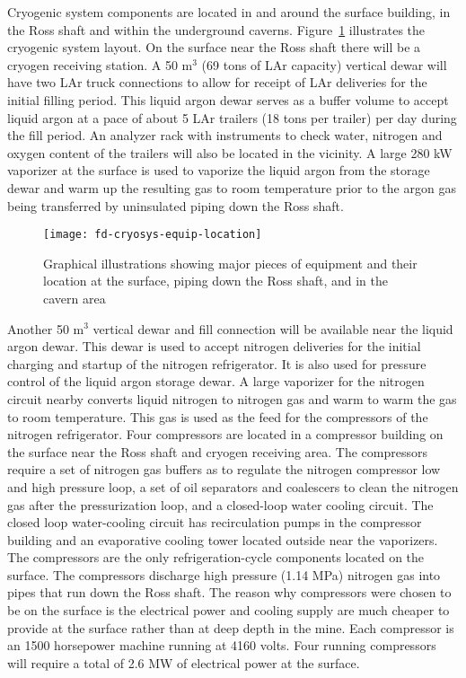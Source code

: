 Cryogenic system components are located in and around the surface 
building, in the Ross shaft and within the underground caverns. 
Figure~\ref{fig:eqp-at-surface} illustrates 
the cryogenic system layout. On the surface near the Ross 
shaft there will be a cryogen 
receiving station. A 50 m$^3$ (69 tons of LAr capacity) 
vertical dewar will have two LAr truck connections 
to allow for receipt of LAr deliveries for the initial
filling period. This liquid argon dewar serves as a buffer volume 
to accept liquid argon at a pace of about 5 LAr trailers 
(18 tons per trailer) per day during the fill period. An analyzer
rack with instruments to check water, nitrogen and oxygen content 
of the trailers will also be located in the vicinity. A large 
280 kW vaporizer at the surface is used to vaporize the liquid
argon from the storage dewar and warm up the resulting gas to 
room temperature prior to the argon gas being 
transferred by uninsulated piping down the Ross shaft.

\begin{figure}[htbp]
\centering
\texttt{[image: fd-cryosys-equip-location]} 
\caption{Graphical illustrations showing major pieces of equipment and their location at the
surface, piping down the Ross shaft, and in the cavern area}
\label{fig:eqp-at-surface}
\end{figure}

Another 50 m$^3$ vertical dewar and fill connection will be 
available near the liquid argon dewar. This dewar is used 
to accept nitrogen deliveries for the initial charging and startup of
the nitrogen refrigerator. It is also used for pressure control of 
the liquid argon storage dewar. A large vaporizer for the nitrogen 
circuit nearby converts liquid nitrogen to nitrogen gas and warm to
warm the gas to room temperature. This gas is used as the feed for
the compressors of the nitrogen refrigerator. Four compressors are 
located in a compressor building on the surface near the Ross shaft 
and cryogen receiving area. The compressors require a set of nitrogen 
gas buffers as to regulate the nitrogen compressor low and high 
pressure loop, a set of oil separators and coalescers to clean the 
nitrogen gas after the pressurization loop, and a closed-loop water 
cooling circuit. The closed loop water-cooling circuit has 
recirculation pumps in the compressor 
building and an evaporative cooling tower located outside 
near the vaporizers. The compressors are the only refrigeration-cycle 
components located on the surface. The compressors discharge high 
pressure (1.14 MPa) nitrogen gas into
pipes that run down the Ross shaft. 
The reason why compressors were chosen to be on the 
surface is the electrical power and cooling supply 
are much cheaper to provide at the surface rather 
than at deep depth in the mine. Each compressor is an 
1500 horsepower machine running at 4160 volts. 
Four running compressors will require a total of
2.6 MW of electrical power at the surface.


